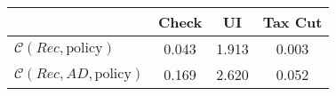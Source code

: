 \begin{tabular}{@{}lccc@{}} 
\toprule 
                          & Check      & UI    & Tax Cut    \\  \midrule 
$\mathcal{C}(Rec,\text{policy})$ & 0.043  & 1.913  & 0.003     \\ 
$\mathcal{C}(Rec, AD,\text{policy})$ & 0.169  & 2.620  & 0.052     \\ 
\end{tabular}  
